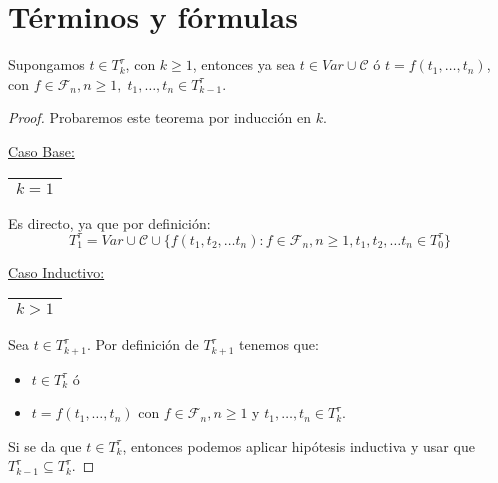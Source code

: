 \section{Términos y fórmulas}

  \begin{lemma}
    \PN Supongamos $t \in T_{k}^{\tau}$, con $k \geq 1$, entonces ya sea $t \in Var \cup \mathcal{C}$ ó $t = f(t_{1},
    \dotsc, t_{n})$, con $f \in \mathcal{F}_{n}, n \geq 1, \; t_{1}, \dotsc, t_{n} \in T_{k-1}^{\tau}$.
  \end{lemma}
  \begin{proof}
    \PN Probaremos este teorema por inducción en $k$.

    \vspace{3mm}
    \PN \underline{Caso Base:} \begin{tabular}{|c|} \hline $k = 1$ \\\hline \end{tabular} Es directo, ya que por
    definición:
    \[
      T_{1}^{\tau} = Var \cup \mathcal{C} \cup \{f(t_{1}, t_{2}, \dotsc t_{n}): f \in \mathcal{F}_n, n \geq 1, t_{1},
      t_{2}, \dotsc t_{n} \in T_{0}^{\tau}\}
    \]

		\PN \underline{Caso Inductivo:} \begin{tabular}{|c|} \hline $k > 1$ \\\hline \end{tabular} Sea $t \in
    T_{k+1}^{\tau}$. Por definición de $ T_{k+1}^{\tau}$ tenemos que:
    \begin{itemize}
      \item $t \in T_{k}^{\tau}$ ó
      \item $t = f(t_{1}, \dotsc, t_{n})$ con $f \in \mathcal{F}_{n}, n \geq 1$ y $t_{1}, \dotsc,t_{n}\in T_{k}^{\tau}$.
    \end{itemize}

    \PN Si se da que $t \in T_{k}^{\tau}$, entonces podemos aplicar hipótesis inductiva y usar que $T_{k-1}^{\tau}
    \subseteq T_{k}^{\tau}$.
  \end{proof}

